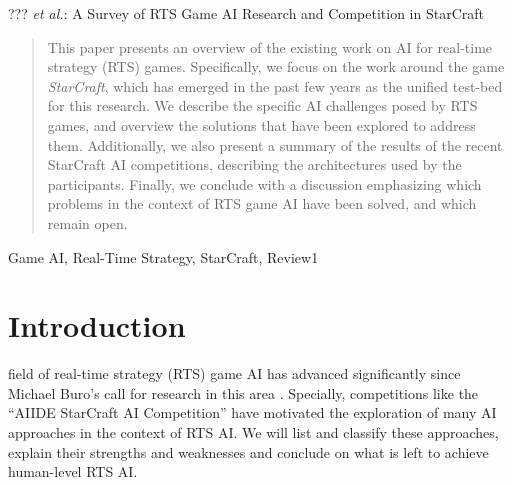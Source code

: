 \documentclass[journal]{IEEEtran}
\begin{document}
%
{??? \MakeLowercase{\textit{et al.}}: A Survey of RTS Game AI Research and Competition in StarCraft}

\maketitle

\begin{abstract}
This paper presents an overview of the existing work on AI for real-time strategy (RTS) games. Specifically, we focus on the work around the game {\em StarCraft}, which has emerged in the past few years as the unified test-bed for this research. We describe the specific AI challenges posed by RTS games, and overview the solutions that have been explored to address them. Additionally, we also present a summary of the results of the recent StarCraft AI competitions, describing the architectures used by the participants. Finally, we conclude with a discussion emphasizing which problems in the context of RTS game AI have been solved, and which remain open.
\end{abstract}

\begin{IEEEkeywords}
Game AI, Real-Time Strategy, StarCraft, Review1

\end{IEEEkeywords}

%
\IEEEpeerreviewmaketitle

\section{Introduction}\label{sec:intro}
 field of real-time strategy (RTS) game AI has advanced significantly since Michael Buro's call for research in this area \cite{Buro03rts}. Specially, competitions like the ``AIIDE StarCraft AI Competition'' have motivated the exploration of many AI approaches in the context of RTS AI. We will list and classify these approaches, explain their 
strengths and weaknesses and conclude on what is left to achieve human-level 
RTS AI.
\end{document}
